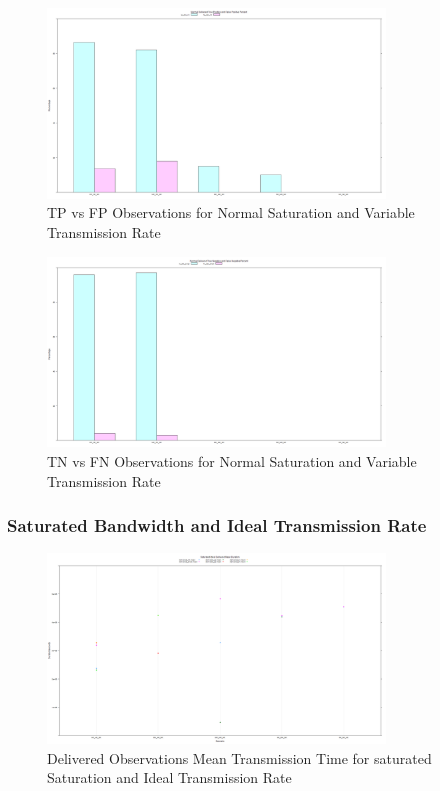 	\begin{figure}[H]
	\centering
	\includegraphics[width=0.8\textwidth]{Chap7/figures/plots/normal_variable/tpvsfp_percent.png}
	\caption{TP vs FP Observations for Normal Saturation and Variable Transmission Rate}
	\label{fig:sim:res:norm:variable:tpfp}
	\end{figure}

	\begin{figure}[H]
	\centering
	\includegraphics[width=0.8\textwidth]{Chap7/figures/plots/normal_variable/tnvsfn_percent.png}
	\caption{TN vs FN Observations for Normal Saturation and Variable Transmission Rate}
	\label{fig:sim:res:norm:variable:tnfn}
	\end{figure}

\subsubsection{Saturated Bandwidth and Ideal Transmission Rate}
	\begin{figure}[H]
	\centering
	\includegraphics[width=0.8\textwidth]{Chap7/figures/plots/saturated_ideal/delivered_mean.png}
	\caption{Delivered Observations Mean Transmission Time for saturated Saturation and Ideal Transmission Rate}
	\label{fig:sim:res:sat:ideal:delmean}
	\end{figure}

